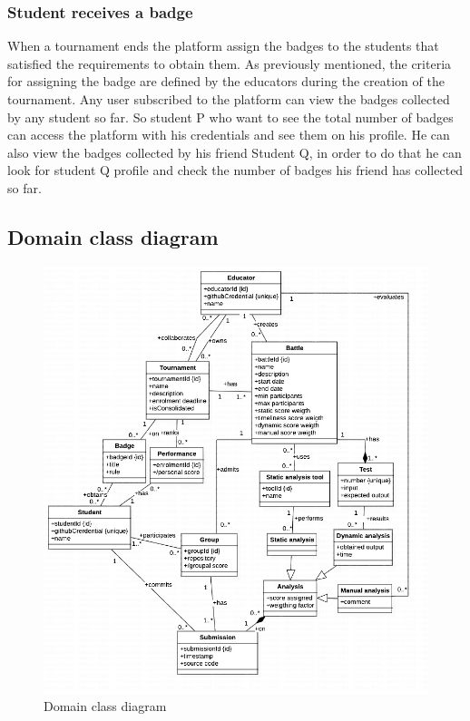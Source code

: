 \subsubsection{Student receives a badge}
When a tournament ends the platform assign the badges to the students that satisfied the requirements to obtain them.
As previously mentioned, the criteria for assigning the badge are defined by the educators during the creation of the tournament.
Any user subscribed to the platform can view the badges collected by any student so far. So student P who want to see the total number of badges can access the platform with his credentials and see them on his profile. He can also view the badges collected by his friend Student Q, in order to do that he can look for student Q profile and check the number of badges his friend has collected so far.
\pagebreak



\subsection{ Domain class diagram}
\begin{figure}[h!]
\centering
\includegraphics[width=\textwidth]{Images/dcd.jpg}
\caption{Domain class diagram}
\label{dcd}
\end{figure}

